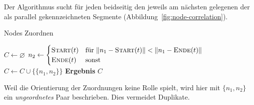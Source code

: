 \documentclass[../main/thesis.tex]{subfiles}
\begin{document}
Der Algorithmus  sucht für jeden  beidseitig den jeweils am nächsten gelegenen  der als parallel gekennzeichneten Segmente (Abbildung~\ref{fig:node-correlation}).

\begin{algorithmhere}{Nodes Zuordnen}
\label{alg:Zuordnen}
\begin{algorithmic}
	\State $C \gets \varnothing$
				\State $n_2 \gets \begin{cases}\textproc{Start}(t) & \text{für } \abs n_1 - \textproc{Start}(t)\abs < \abs n_1 - \textproc{Ende}(t)\abs\\\textproc{Ende}(t) & \text{sonst}\end{cases}$
				\State $C \gets C \cup \{\{n_1, n_2\}\}$
			\EndFor
		\EndFor
	\EndFor
	\State \textbf{Ergebnis} $C$
\EndFunction
\end{algorithmic}
\end{algorithmhere}


Weil die Orientierung der Zuordnungen keine Rolle spielt, wird hier mit $\{n_1, n_2\}$ ein \emph{ungeordnetes} Paar beschrieben.
Dies vermeidet Duplikate.

\end{document}
